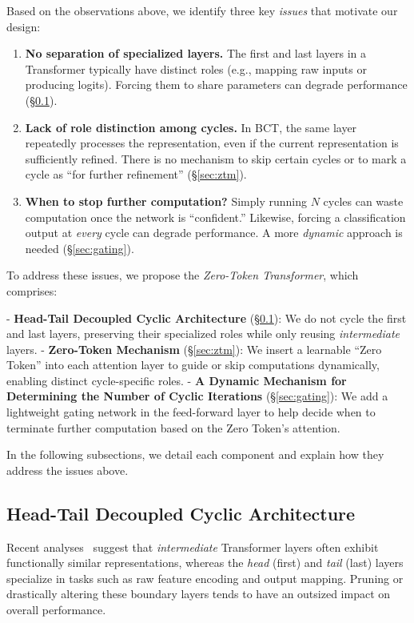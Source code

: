 Based on the observations above, we identify three key \emph{issues} that motivate our design:
\begin{enumerate}[label=\textbf{Issue \arabic*:}, leftmargin=1.2cm, itemsep=2pt, topsep=2pt]
    \item \textbf{No separation of specialized layers.} 
    The first and last layers in a Transformer typically have distinct roles (e.g., mapping raw inputs or producing logits). Forcing them to share parameters can degrade performance (\S\ref{sec:hdt}).

    \item \textbf{Lack of role distinction among cycles.} 
    In BCT, the same layer repeatedly processes the representation, even if the current representation is sufficiently refined. There is no mechanism to skip certain cycles or to mark a cycle as “for further refinement” (\S\ref{sec:ztm}).

    \item \textbf{When to stop further computation?}
    Simply running $N$ cycles can waste computation once the network is “confident.” Likewise, forcing a classification output at \emph{every} cycle can degrade performance. A more \emph{dynamic} approach is needed (\S\ref{sec:gating}).
\end{enumerate}

To address these issues, we propose the \emph{Zero-Token Transformer}, which comprises:

- \textbf{Head-Tail Decoupled Cyclic Architecture} (\S\ref{sec:hdt}): We do not cycle the first and last layers, preserving their specialized roles while only reusing \emph{intermediate} layers.
- \textbf{Zero-Token Mechanism} (\S\ref{sec:ztm}): We insert a learnable “Zero Token” into each attention layer to guide or skip computations dynamically, enabling distinct cycle-specific roles.
- \textbf{A Dynamic Mechanism for Determining the Number of Cyclic Iterations} (\S\ref{sec:gating}): We add a lightweight gating network in the feed-forward layer to help decide when to terminate further computation based on the Zero Token's attention.

In the following subsections, we detail each component and explain how they address the issues above.

\subsection{Head-Tail Decoupled Cyclic Architecture}
\label{sec:hdt}

Recent analyses~\cite{sun2024transformer} suggest that \emph{intermediate} Transformer layers often exhibit functionally similar representations, whereas the \emph{head} (first) and \emph{tail} (last) layers specialize in tasks such as raw feature encoding and output mapping. 
Pruning or drastically altering these boundary layers tends to have an outsized impact on overall performance.

